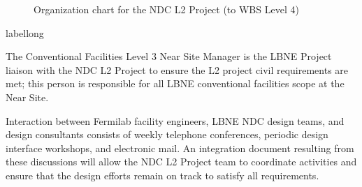 \begin{figure}
\begin{center}
\caption[Organization chart for the NDC L2 Project to L4]{\label{fig:nd-org} Organization chart for the NDC L2 Project (to WBS Level 4)}
\end{center}
\end{figure}
\begin{cdrfigure}[short]{label}{long}
\end{cdrfigure}

The Conventional Facilities Level 3 Near Site Manager is the LBNE Project liaison with the NDC L2 Project 
to ensure the L2 project civil requirements are met; 
this person is responsible for all LBNE conventional facilities scope at the Near Site. 

Interaction between Fermilab facility engineers, LBNE NDC design teams, and
design consultants consists of 
weekly telephone conferences, periodic design interface workshops, and
electronic mail. An integration document resulting from these discussions will allow the NDC L2 Project team to coordinate activities and ensure that the design efforts remain on track to satisfy all requirements.



